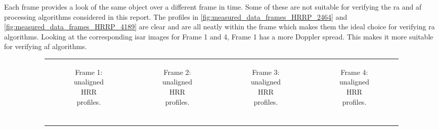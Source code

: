\documentclass[class=report,11pt,crop=false]{standalone}
\begin{document}
Each frame provides a look of the same object over a different frame in time. Some of these are not suitable for verifying the \gls{ra} and \gls{af} processing algorithms considered in this report. The profiles in \autoref{fig:measured_data_frames_HRRP_2464} and \autoref{fig:measured_data_frames_HRRP_4189} are clear and are all neatly within the frame which makes them the ideal choice for verifying \gls{ra} algorithms. Looking at the corresponding \gls{isar} images for Frame 1 and 4, Frame 1 has a more Doppler spread. This makes it more suitable for verifying \gls{af} algorithms.
    \begin{figure}[h]
        \begin{minipage}{0.9\linewidth}
            \begin{figure}
                \begin{tabular}{@{}cccc@{}}
                    \begin{subfigure}{0.25\linewidth}
                        \centering
                        \resizebox{\linewidth}{!}{}
                        \caption{Frame 1: unaligned HRR profiles.}
                    \end{subfigure}
                    &
                    \begin{subfigure}{0.25\linewidth}
                        \centering
                        \resizebox{\linewidth}{!}{}
                        \caption{Frame 2: unaligned HRR profiles.}
                    \end{subfigure}
                    &
                    \begin{subfigure}{0.25\linewidth}
                        \centering
                        \resizebox{\linewidth}{!}{}
                        \caption{Frame 3: unaligned HRR profiles.}
                    \end{subfigure}
                    &
                    \begin{subfigure}{0.25\linewidth}
                        \centering
                        \resizebox{\linewidth}{!}{}
                        \caption{Frame 4: unaligned HRR profiles.}
                    \end{subfigure}
                    \\
                    \begin{subfigure}{0.25\linewidth}

\end{subfigure}
\end{tabular}
\end{figure}
\end{minipage}
\end{figure}
\end{document}
